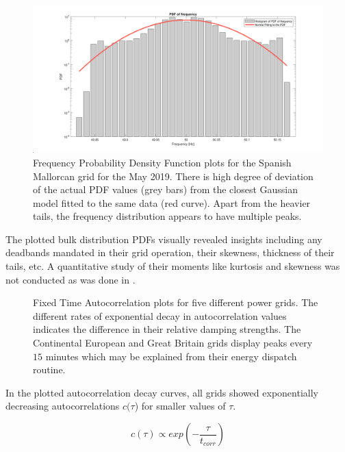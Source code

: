 \begin{figure}[!ht]
	\includegraphics[scale=0.25]{../figures/pdf/pdf_frequency_spain_mallorca_2019_05_f1}
	\caption{Frequency Probability Density Function plots for the Spanish Mallorcan grid for the May 2019. There is high degree of deviation of the actual PDF values (grey bars) from the closest Gaussian model fitted to the same data (red curve). Apart from the heavier tails, the frequency distribution appears to have multiple peaks.}
\end{figure}


The plotted bulk distribution PDFs visually revealed insights including any deadbands \cite{francesca01, vorobev01} mandated in their grid operation, their skewness, thickness of their tails, etc. A quantitative study of their moments like kurtosis and skewness was not conducted as was done in \cite{schafer01}.

\begin{figure}[ht]
	\centering
	\caption{Fixed Time Autocorrelation plots for five different power grids. The different rates of exponential decay in autocorrelation values indicates the difference in their relative damping strengths. The Continental European and Great Britain grids display peaks every $15$ minutes which may be explained from their energy dispatch routine.}
	\label{fig:comp5}
\end{figure}

In the plotted autocorrelation decay curves, all grids showed exponentially decreasing autocorrelations $c(\tau$) for smaller values of $\tau$. 

\begin{equation}
	c(\tau) \propto exp{\left(-\frac{\tau}{t_{corr}}\right)}
\end{equation}

